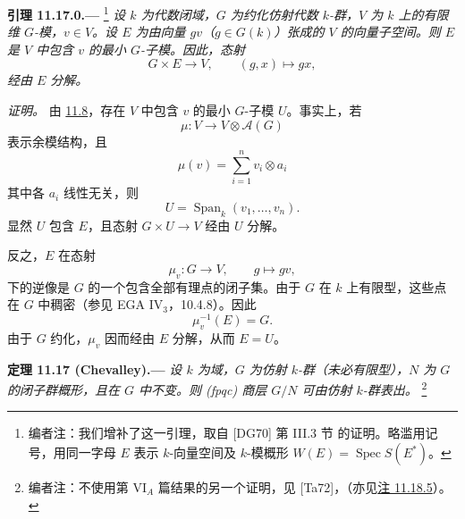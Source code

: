 

\medskip
{}\label{lem:sga3-VIB-11.17.0}%
\noindent\textbf{引理 11.17.0.---}%
\footnote{\label{note:sga3-VIB-130}编者注：我们增补了这一引理，取自 \textup{[DG70]} 第 III.3 节 的证明。略滥用记号，用同一字母 \(E\) 表示 \(k\)-向量空间及 \(k\)-模概形 \(W(E)=\operatorname{Spec}S(E^*)\)。}
\emph{设 \(k\) 为代数闭域，\(G\) 为约化仿射代数 \(k\)-群，\(V\) 为 \(k\) 上的有限维 \(G\)-模，\(v\in V\)。设 \(E\) 为由向量 \(gv\)（\(g\in G(k)\)）张成的 \(V\) 的向量子空间。则 \(E\) 是 \(V\) 中包含 \(v\) 的最小 \(G\)-子模。因此，态射}
\[
  G\times E\longrightarrow V,\qquad (g,x)\longmapsto gx,
\]
\emph{经由 \(E\) 分解。}

\emph{证明。}
由 \hyperref[lem:sga3-VIB-11.8]{11.8}，存在 \(V\) 中包含 \(v\) 的最小 \(G\)-子模 \(U\)。事实上，若
\[
  \mu:V\longrightarrow V\otimes\mathcal A(G)
\]
表示余模结构，且
\[
  \mu(v)=\sum_{i=1}^{n}v_i\otimes a_i
\]
其中各 \(a_i\) 线性无关，则
\[
  U=\operatorname{Span}_k(v_1,\ldots,v_n).
\]
显然 \(U\) 包含 \(E\)，且态射 \(G\times U\to V\) 经由 \(U\) 分解。

反之，\(E\) 在态射
\[
  \mu_v:G\longrightarrow V,\qquad g\longmapsto gv,
\]
下的逆像是 \(G\) 的一个包含全部有理点的闭子集。由于 \(G\) 在 \(k\) 上有限型，这些点在 \(G\) 中稠密\textup{（参见 EGA IV\(_3\)，10.4.8）}。因此
\[
  \mu_v^{-1}(E)=G.
\]
由于 \(G\) 约化，\(\mu_v\) 因而经由 \(E\) 分解，从而 \(E=U\)。

\medskip
{}\label{thm:sga3-VIB-11.17}%
\noindent\textbf{定理 11.17 \textup{(Chevalley)}.---}
\emph{设 \(k\) 为域，\(G\) 为仿射 \(k\)-群\textup{（未必有限型）}，\(N\) 为 \(G\) 的闭子群概形，且在 \(G\) 中不变。则 \textup{(fpqc)} 商层 \(G/N\) 可由仿射 \(k\)-群表出。}%
\footnote{\label{note:sga3-VIB-131}编者注：不使用第 VI\(_A\) 篇结果的另一个证明，见 \textup{[Ta72]}，\textup{（亦见\hyperref[rem:sga3-VIB-11.18.5]{注 11.18.5}）}。}

